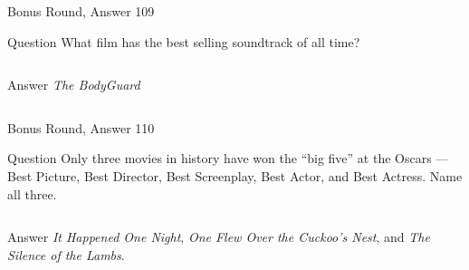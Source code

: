 \documentclass[11pt]{beamer}
\begin{document}
\begin{frame}[t]{Bonus Round, Answer 109}
\vspace{2em}
\begin{block}{Question}
What film has the best selling soundtrack of all time?
\end{block}
\pause{}
\begin{columns}[T,totalwidth=\linewidth]
\begin{column}{0.35\linewidth}
\begin{block}{Answer}
\emph{The BodyGuard}
\end{block}
\end{column}
\begin{column}{0.6\linewidth}
\begin{center}
\texttt{[image: \{Images/bodyguard]}.jpg}
\end{center}
\end{column}
\end{columns}
\end{frame}
    

\begin{frame}[t]{Bonus Round, Answer 110}
\vspace{2em}
\begin{block}{Question}
Only three movies in history have won the ``big five'' at the Oscars — Best Picture, Best Director, Best Screenplay, Best Actor, and Best Actress. Name all three.
\end{block}
\pause{}
\begin{columns}[T,totalwidth=\linewidth]
\begin{column}{0.35\linewidth}
\begin{block}{Answer}
\emph{It Happened One Night}, \emph{One Flew Over the Cuckoo's Nest}, and \emph{The Silence of the Lambs}.
\end{block}
\end{column}
\begin{column}{0.6\linewidth}
\begin{center}
\texttt{[image: \{Images/big-five]}.png}
\end{center}
\end{column}
\end{columns}
\end{frame}
    

\section*{\ }
\end{document}

